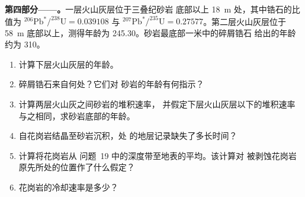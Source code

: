 \begin{problem}
\noindent\textbf{第四部分——。}一层火山灰层位于三叠纪砂岩
底部以上 \qty{18}{m} 处，其中锆石的比值为
$^{206}\mathrm{Pb}^*/^{238}\mathrm{U} = 0.039108$ 与
$^{207}\mathrm{Pb}^*/^{235}\mathrm{U} = 0.27577$。第二层火山灰层位于 \qty{58}{m}
底部以上，测得年龄为 \qty{245.30}{\Ma}。砂岩最底部一米中的碎屑锆石
给出的年龄约为 \qty{310}{\Ma}。
\begin{enumerate}[resume]
  \item 计算下层火山灰层的年龄。
  \item 碎屑锆石来自何处？它们对
        砂岩的年龄有何指示？
  \item 计算两层火山灰之间砂岩的堆积速率，
        并假定下层火山灰层以下的堆积速率与之相同，求砂岩底部的年龄。
  \item 自花岗岩结晶至砂岩沉积，处
        的地层记录缺失了多长时间？
  \item 计算将花岗岩从
        问题~19 中的深度带至地表的平均。该计算对
        被剥蚀花岗岩原先所处的位置作了什么假定？
  \item 花岗岩的冷却速率是多少？
\end{enumerate}
\end{problem}
